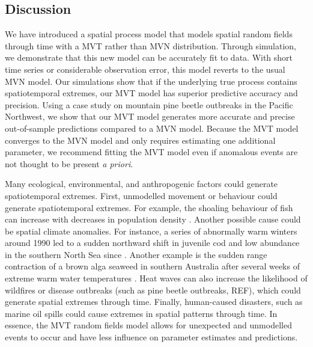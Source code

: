 \documentclass[12pt,english]{article}
\begin{document}
\begin{spacing}{1.9}
\section{Discussion}

We have introduced a spatial process model that models spatial random fields
through time with a MVT rather than MVN distribution. Through simulation, we
demonstrate that this new model can be accurately fit to data. With short time
series or considerable observation error, this model reverts to the usual MVN
model. Our simulations show that if the underlying true process contains
spatiotemporal extremes, our MVT model has superior predictive accuracy and
precision. Using a case study on mountain pine beetle outbreaks in the Pacific
Northwest, we show that our MVT model generates more accurate and precise
out-of-sample predictions compared to a MVN model. Because the MVT model
converges to the MVN model and only requires estimating one additional
parameter, we recommend fitting the MVT model even if anomalous events are not
thought to be present \textit{a priori}.

Many ecological, environmental, and anthropogenic factors could generate
spatiotemporal extremes. First, unmodelled movement or behaviour could generate
spatiotemporal extremes. For example, the shoaling behaviour of fish can
increase with decreases in population density \citep[e.g.][]{rose1999}. Another
possible cause could be spatial climate anomalies. For instance, a series of
abnormally warm winters around 1990 led to a sudden northward shift in juvenile
cod and low abundance in the southern North Sea since \citep{rindorf2006}.
Another example is the sudden range contraction of a brown alga seaweed in
southern Australia after several weeks of extreme warm water temperatures
\citep{smale2013}. Heat waves can also increase the likelihood of wildfires or
disease outbreaks (such as pine beetle outbreaks, REF), which could generate
spatial extremes through time. Finally, human-caused disasters, such as marine
oil spills could cause extremes in spatial patterns through time. In essence,
the MVT random fields model allows for unexpected and unmodelled events to occur
and have less influence on parameter estimates and predictions.




\end{spacing}
\end{document}
